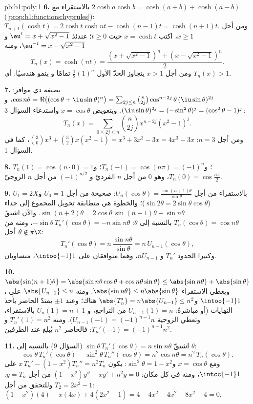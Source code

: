 \begin{solution}{pb:b1:poly:1}
\textbf{6.} بالاستقراء مع $2\cosh a\cosh b = \cosh(a + b) +
\cosh(a - b)$ (\cref{prop:b1:functions:hyprules}): $T_{n+1}(\cosh
t) = 2\cosh t\cosh nt - \cosh(n-1)t = \cosh(n+1)t$. ومن أجل $x \geq
1$، اكتب $x = \cosh t$ حيث $t \geq 0$؛ عندئذ $\eu^t = x +
\sqrt{x^2 - 1}$ و$\eu^{-t} = x - \sqrt{x^2 - 1}$، ومنه
\[
T_n(x) = \cosh(nt)
= \frac{(x + \sqrt{x^2-1})^n + (x - \sqrt{x^2-1})^n}2 .
\]
ومن أجل $x > 1$ يتجاوز الحدّ الأول $\frac12(1)^n$ تمامًا و
ينمو هندسيًا: أي $T_n(x) > 1$.

\textbf{7.} بصيغة دي موافر: $\cos n\theta = \Re\bigl((\cos\theta +
\iu\sin\theta)^n\bigr) = \sum_{2j \leq n}\binom n{2j}
\cos^{n-2j}\theta\,(\iu\sin\theta)^{2j}$، و$(\iu\sin\theta)^{2j}
= (-\sin^2\theta)^j = (\cos^2\theta - 1)^j$. وبتعويض $x =
\cos\theta$ واستدعاء السؤال 3:
\[
T_n(x) = \sum_{0\leq 2j\leq n}\binom n{2j}x^{n-2j}(x^2 - 1)^j .
\]
ومن أجل $n = 3$: $\binom30 x^3 + \binom32 x(x^2 - 1) = x^3 + 3x^3 -
3x = 4x^3 - 3x$، كما في السؤال 1.

\textbf{8.} $T_n(1) = \cos(n\cdot0) = 1$؛ و$T_n(-1) = \cos(n\pi) =
(-1)^n$؛ و$T_n(0) = \cos\frac{n\pi}2$، وهو $0$ من أجل $n$ الفرديّ و
$(-1)^{n/2}$ من أجل $n$ الزوجيّ.

\textbf{9.} بالاستقراء من أجل $U_n(\cos\theta) =
\frac{\sin(n+1)\theta}{\sin\theta}$: صحيحة من أجل $U_0 = 1$ و$U_1 =
2X$ ($\sin2\theta = 2\sin\theta\cos\theta$)؛ والخطوة هي
متطابقة تحويل المجموع إلى جداء $\sin(n+2)\theta = 2\cos\theta\,
\sin(n+1)\theta - \sin n\theta$. والآن اشتقّ
$T_n(\cos\theta) = \cos n\theta$ بالنسبة إلى $\theta$:
$-\sin\theta\,T_n'(\cos\theta) = -n\sin n\theta$، ومنه من أجل $\theta
\notin \pi\Z$:
\[
T_n'(\cos\theta) = n\,\frac{\sin n\theta}{\sin\theta}
= n\,U_{n-1}(\cos\theta) ,
\]
وكثيرا الحدود $T_n'$ و $nU_{n-1}$، وهما متوافقان على
$\intoo{-1}1$، متساويان.

\textbf{10.} $\abs{\sin(n+1)\theta} = \abs{\sin n\theta\cos\theta
+ \cos n\theta\sin\theta} \leq \abs{\sin n\theta} +
\abs{\sin\theta}$، ويعطي الاستقراء $\abs{\sin n\theta} \leq
n\abs{\sin\theta}$. ومنه $\abs{U_{n-1}} \leq n$ على $\intoo{-1}1$
و$\abs{T_n'} = n\abs{U_{n-1}} \leq n^2$ هناك؛ وعند $\pm1$ يمتدّ
الحاصر بأخذ النهايات (أو مباشرةً: $U_{n-1}(1) = n$ من
التراجع، و $U_n(1) = n + 1$ بالاستقراء، وتعطي الزوجية
$U_{n-1}(-1) = (-1)^{n-1}n$). ومنه $T_n'(1) = n^2$ و$T_n'(-1)
= (-1)^{n-1}n^2$: فالحاصر $n^2$ يُبلغ عند الطرفين.

\textbf{11.} اشتقّ $\sin\theta\,T_n'(\cos\theta) = n\sin
n\theta$ (السؤال 9) بالنسبة إلى $\theta$:
\[
\cos\theta\,T_n'(\cos\theta) - \sin^2\theta\,T_n''(\cos\theta)
= n^2\cos n\theta = n^2\,T_n(\cos\theta) .
\]
ومع $x = \cos\theta$ و$\sin^2\theta = 1 - x^2$: يكون $x\,T_n' - (1
- x^2)T_n'' = n^2T_n$ على $\intcc{-1}1$، ومنه في كل مكان:
$(1 - x^2)y'' - xy' + n^2y = 0$ من أجل $y = T_n$. وللتحقق من أجل $T_2 =
2x^2 - 1$: $(1 - x^2)(4) - x(4x) + 4(2x^2 - 1) = 4 - 4x^2 - 4x^2
+ 8x^2 - 4 = 0$.


\end{solution}
